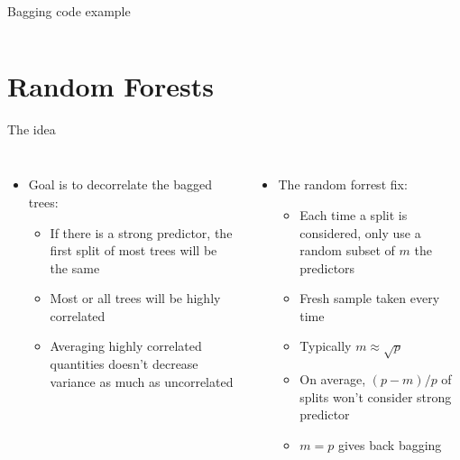 \documentclass[aspectratio=169,usenames,dvipsnames]{beamer}
\begin{document}
{
\begin{frame}[t]{Bagging code example}
\begin{columns}
\centering
{}
\centering
\end{columns}
\end{frame}
}

\section{Random Forests}



\begin{frame}[t]{The idea }

\begin{columns}
\centering
\begin{itemize}
	\item Goal is to decorrelate the bagged trees:
	\begin{itemize}
		\item If there is a strong predictor, the first split of most trees will be the same
		\item Most or all trees will be highly correlated
		\item Averaging highly correlated quantities doesn't decrease variance as much as uncorrelated
	\end{itemize}
\end{itemize}
\centering
\begin{itemize}
	\item The random forrest fix:
	\begin{itemize}
		\item Each time a split is considered, only use a random subset of $m$ the predictors
		\item Fresh sample taken every time
		\item Typically $m \approx \sqrt p$
		\item On average, $(p-m)/p$ of splits won't consider strong predictor
		\item $m = p$ gives back bagging
	\end{itemize}
\end{itemize}
\end{columns}

\end{frame}
\end{document}
